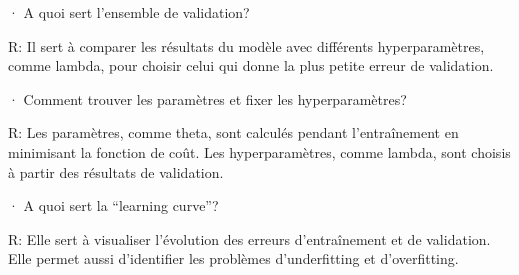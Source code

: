 · A quoi sert l’ensemble de validation?
\vspace{\baselineskip}

R: Il sert à comparer les résultats du modèle avec différents hyperparamètres, comme lambda, pour choisir celui qui donne la plus petite erreur de validation.
\vspace{\baselineskip}

· Comment trouver les paramètres et fixer les hyperparamètres?
\vspace{\baselineskip}

R: Les paramètres, comme theta, sont calculés pendant l'entraînement en minimisant la fonction de coût. Les hyperparamètres, comme lambda, sont choisis à partir des résultats de validation.
\vspace{\baselineskip}

· A quoi sert la “learning curve”?
\vspace{\baselineskip}

R: Elle sert à visualiser l'évolution des erreurs d'entraînement et de validation. Elle permet aussi d'identifier les problèmes d'underfitting et d'overfitting.

